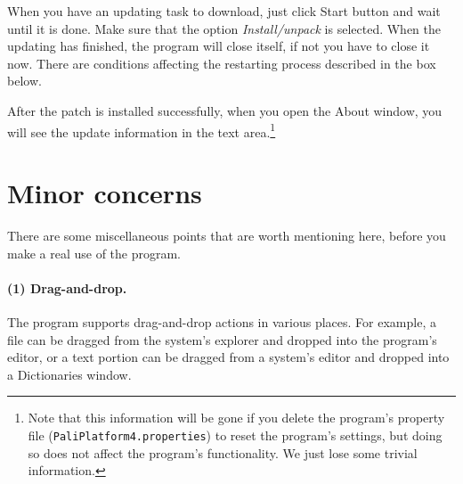 When you have an updating task to download, just click Start button and wait until it is done. Make sure that the option \emph{Install/unpack} is selected. When the updating has finished, the program will close itself, if not you have to close it now. There are conditions affecting the restarting process described in the box below.

\newpage
{}

After the patch is installed successfully, when you open the About window, you will see the update information in the text area.\footnote{Note that this information will be gone if you delete the program's property file (\texttt{PaliPlatform4.properties}) to reset the program's settings, but doing so does not affect the program's functionality. We just lose some trivial information.}

\section{Minor concerns}

There are some miscellaneous points that are worth mentioning here, before you make a real use of the program.

\paragraph{(1) Drag-and-drop.} The program supports drag-and-drop actions in various places. For example, a file can be dragged from the system's explorer and dropped into the program's editor, or a text portion can be dragged from a system's editor and dropped into a Dictionaries window.

